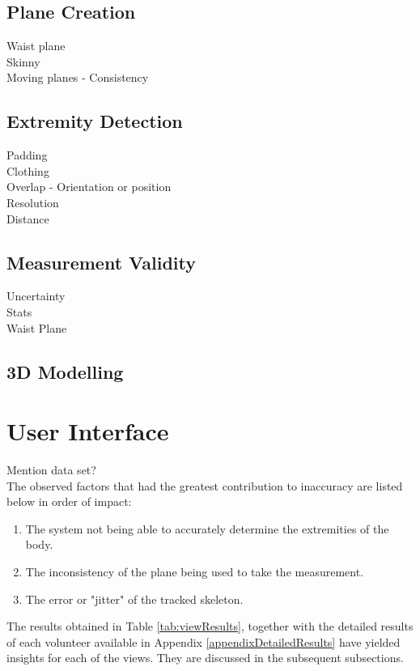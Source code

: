 \subsection{Plane Creation}
Waist plane\\
Skinny\\
Moving planes - Consistency\\

\subsection{Extremity Detection}
Padding\\
Clothing\\
Overlap - Orientation or position\\
Resolution\\
Distance\\

\subsection{Measurement Validity}
Uncertainty\\
Stats\\
Waist Plane\\

\subsection{3D Modelling}

\section{User Interface}

\iffalse

Mention data set?\\

The observed factors that had the greatest contribution to inaccuracy are listed below in order of impact:

\begin{enumerate}
	\item The system not being able to accurately determine the extremities of the body.
	\item The inconsistency of the plane being used to take the measurement.
	\item The error or "jitter" of the tracked skeleton.
\end{enumerate}



The results obtained in Table \ref{tab:viewResults}, together with the detailed results of each volunteer available in Appendix \ref{appendixDetailedResults} have yielded insights for each of the views. They are discussed in the subsequent subsections. 

